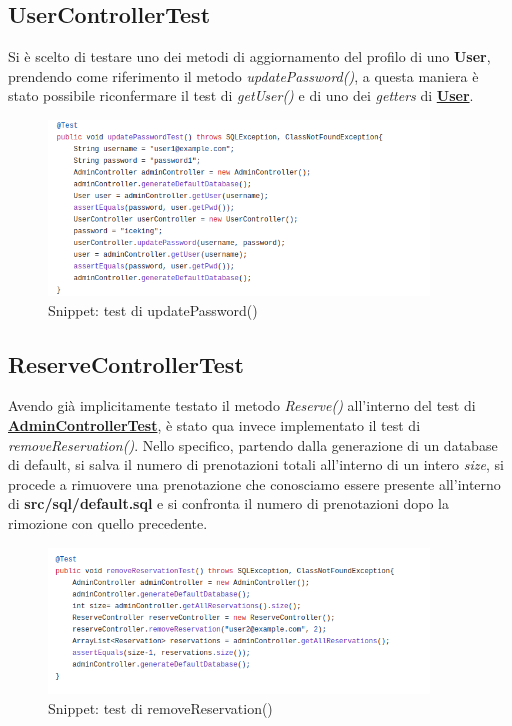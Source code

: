 \documentclass{article}
\begin{document}
{\subsection{UserControllerTest}\label{subsection:usercontrollertest}
Si è scelto di testare uno dei metodi di aggiornamento del profilo di uno \textbf{User}, prendendo come riferimento il metodo \textit{updatePassword()}, a questa maniera è stato possibile riconfermare il test di \textit{getUser()} e di uno dei \textit{getters} di \hyperref[subsubsec:user]{\textbf{User}}.
\begin{figure}[H]
                \centering
                \includegraphics[width=0.9\textwidth]{Images/Snippets/updatePasswordTest.png}
                \captionsetup{labelformat=empty,labelsep=none}
                \caption{Snippet: test di updatePassword()}
                \label{fig:Usercontrollertest}
            \end{figure}
\subsection{ReserveControllerTest}\label{subsection:reservecontrollertest}
Avendo già implicitamente testato il metodo \textit{Reserve()} all'interno del test di \hyperref[fig:Admincontrollertestsnippets]{\textbf{AdminControllerTest}}, è stato qua invece implementato il test di \textit{removeReservation()}. Nello specifico, partendo dalla generazione di un database di default, si salva il numero di prenotazioni totali all'interno di un intero \textit{size}, si procede a rimuovere una prenotazione che conosciamo essere presente all'interno di \textbf{src/sql/default.sql} e si confronta il numero di prenotazioni dopo la rimozione con quello precedente.
\begin{figure}[H]
                \centering
                \includegraphics[width=0.9\textwidth]{Images/Snippets/removeReservationTest.png}
                \captionsetup{labelformat=empty,labelsep=none}
                \caption{Snippet: test di removeReservation()}
                \label{fig:ReserveControllerTest}
            \end{figure}
}
\end{document}
